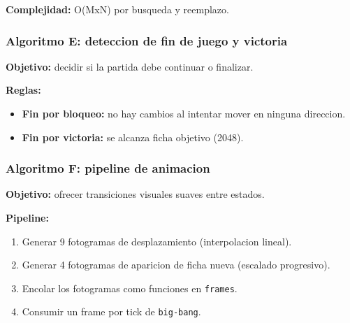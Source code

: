\documentclass[12pt,a4paper]{article}
\begin{document}
\textbf{Complejidad:} O(MxN) por busqueda y reemplazo.

\subsubsection*{Algoritmo E: deteccion de fin de juego y victoria}
\textbf{Objetivo:} decidir si la partida debe continuar o finalizar.

\textbf{Reglas:}
\begin{itemize}
    \item \textbf{Fin por bloqueo:} no hay cambios al intentar mover en ninguna direccion.
    \item \textbf{Fin por victoria:} se alcanza ficha objetivo (2048).
\end{itemize}

\subsubsection*{Algoritmo F: pipeline de animacion}
\textbf{Objetivo:} ofrecer transiciones visuales suaves entre estados.

\textbf{Pipeline:}
\begin{enumerate}
    \item Generar 9 fotogramas de desplazamiento (interpolacion lineal).
    \item Generar 4 fotogramas de aparicion de ficha nueva (escalado progresivo).
    \item Encolar los fotogramas como funciones en \texttt{frames}.
    \item Consumir un frame por tick de \texttt{big-bang}.
\end{enumerate}
\end{document}
